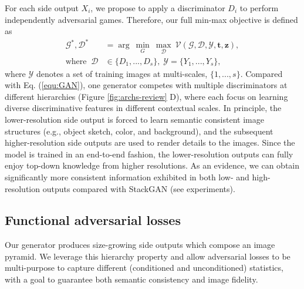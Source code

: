 \documentclass[10pt,twocolumn,letterpaper]{article}
\begin{document}
For each side output $X_i$, we propose to apply a discriminator $D_i$ to perform independently adversarial games. Therefore, our full min-max objective is defined as 
\begin{equation}
\label{equ:optim}
\begin{split}
  \mathcal{G}^*, \mathcal{D}^*&  =  \arg~\underset{G}{\min}\ \underset{\mathcal{D}}{\max}~ \mathcal{V}(\mathcal{G},\mathcal{D}, \mathcal{Y}, \bm t, \bm z), \\
  \text{where} \;\;	 \mathcal{D} & \in  \{D_1, ..., D_s\}, \; \mathcal{Y} = \{Y_1, ..., Y_s\},
\end{split}
\end{equation}
where $ \mathcal{Y}$ denotes a set of training images at multi-scales, $\{1,...,s\}$.
Compared with Eq. (\ref{equ:GAN}), one generator competes with multiple discriminators at different hierarchies (Figure \ref{fig:archs-review} D), where each focus on learning diverse discriminative features in different contextual scales.
In principle, the lower-resolution side output is forced to learn semantic consistent image structures (e.g., object sketch, color, and background), and the subsequent higher-resolution side outputs are used to render details to the images. Since the model is trained in an end-to-end fashion, the lower-resolution outputs can fully enjoy top-down knowledge from higher resolutions.
As an evidence, we can obtain significantly more consistent information exhibited in both low- and high-resolution outputs compared with StackGAN (see experiments). 


\subsection{Functional adversarial losses}
Our generator produces size-growing side outputs which compose an image pyramid. 
We leverage this hierarchy property and allow adversarial losses to be multi-purpose to capture different (conditioned and unconditioned) statistics, with a goal to guarantee both semantic consistency and image fidelity. 
\end{document}
